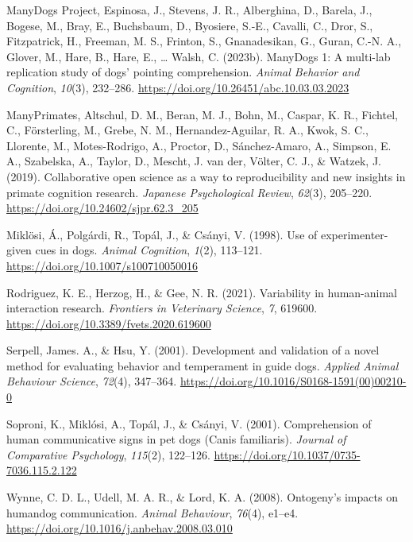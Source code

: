 \documentclass[
  man,floatsintext]{apa6}
\newlength{\cslhangindent}
\newlength{\cslentryspacingunit} %
\newenvironment{CSLReferences}[2] %
 {%
  \setlength{\parindent}{0pt}
  \ifodd #1
  \let\oldpar\par
  \def\par{\hangindent=\cslhangindent\oldpar}
  \fi
  \setlength{\parskip}{#2\cslentryspacingunit}
 }%
 {}
\begin{document}
\begin{CSLReferences}{1}{0}
\leavevmode{}%
ManyDogs Project, Espinosa, J., Stevens, J. R., Alberghina, D., Barela, J., Bogese, M., Bray, E., Buchsbaum, D., Byosiere, S.-E., Cavalli, C., Dror, S., Fitzpatrick, H., Freeman, M. S., Frinton, S., Gnanadesikan, G., Guran, C.-N. A., Glover, M., Hare, B., Hare, E., \ldots{} Walsh, C. (2023b). {ManyDogs} 1: {A} multi-lab replication study of dogs' pointing comprehension. \emph{Animal Behavior and Cognition}, \emph{10}(3), 232--286. \url{https://doi.org/10.26451/abc.10.03.03.2023}

\leavevmode{}%
ManyPrimates, Altschul, D. M., Beran, M. J., Bohn, M., Caspar, K. R., Fichtel, C., Försterling, M., Grebe, N. M., Hernandez-Aguilar, R. A., Kwok, S. C., Llorente, M., Motes-Rodrigo, A., Proctor, D., Sánchez-Amaro, A., Simpson, E. A., Szabelska, A., Taylor, D., Mescht, J. van der, Völter, C. J., \& Watzek, J. (2019). Collaborative open science as a way to reproducibility and new insights in primate cognition research. \emph{Japanese Psychological Review}, \emph{62}(3), 205--220. \url{https://doi.org/10.24602/sjpr.62.3_205}

\leavevmode{}%
Miklösi, Á., Polgárdi, R., Topál, J., \& Csányi, V. (1998). Use of experimenter-given cues in dogs. \emph{Animal Cognition}, \emph{1}(2), 113--121. \url{https://doi.org/10.1007/s100710050016}

\leavevmode{}%
Rodriguez, K. E., Herzog, H., \& Gee, N. R. (2021). Variability in human-animal interaction research. \emph{Frontiers in Veterinary Science}, \emph{7}, 619600. \url{https://doi.org/10.3389/fvets.2020.619600}

\leavevmode{}%
Serpell, James. A., \& Hsu, Y. (2001). Development and validation of a novel method for evaluating behavior and temperament in guide dogs. \emph{Applied Animal Behaviour Science}, \emph{72}(4), 347--364. \url{https://doi.org/10.1016/S0168-1591(00)00210-0}

\leavevmode{}%
Soproni, K., Miklósi, A., Topál, J., \& Csányi, V. (2001). Comprehension of human communicative signs in pet dogs ({Canis} familiaris). \emph{Journal of Comparative Psychology}, \emph{115}(2), 122--126. \url{https://doi.org/10.1037/0735-7036.115.2.122}

\leavevmode{}%
Wynne, C. D. L., Udell, M. A. R., \& Lord, K. A. (2008). Ontogeny's impacts on human{\textendash}dog communication. \emph{Animal Behaviour}, \emph{76}(4), e1--e4. \url{https://doi.org/10.1016/j.anbehav.2008.03.010}

\end{CSLReferences}
\end{document}
